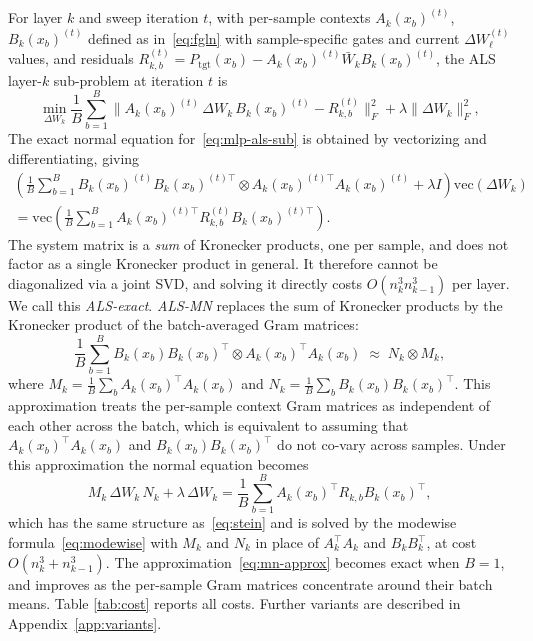 \documentclass{article}
\newcommand{\normF}[1]{\|#1\|_F}
\newcommand{\Ptgt}{P_{\mathrm{tgt}}}
\newcommand{\vecop}{\mathrm{vec}}
\begin{document}
For layer $k$ and sweep iteration $t$, with per-sample contexts $A_k(x_b)^{(t)}$, $B_k(x_b)^{(t)}$ defined as
in~\eqref{eq:fgln} with sample-specific gates and current $\Delta W_\ell^{(t)}$ values, and residuals
$R_{k,b}^{(t)} = \Ptgt(x_b) - A_k(x_b)^{(t)}\bar W_k B_k(x_b)^{(t)}$, the ALS layer-$k$
sub-problem at iteration $t$ is
\begin{equation}
  \min_{\Delta W_k}
  \frac{1}{B}\sum_{b=1}^B
  \normF{A_k(x_b)^{(t)}\,\Delta W_k\,B_k(x_b)^{(t)} - R_{k,b}^{(t)}}^2
  + \lambda \normF{\Delta W_k}^2,
  \label{eq:mlp-als-sub}
\end{equation}
The exact normal equation for~\eqref{eq:mlp-als-sub} is obtained by
vectorizing and differentiating, giving
\begin{align}
  \left(
    \frac{1}{B}\sum_{b=1}^B B_k(x_b)^{(t)}B_k(x_b)^{(t)\top} \otimes A_k(x_b)^{(t)\top} A_k(x_b)^{(t)}
    + \lambda I
  \right) \vecop(\Delta W_k) \nonumber
  \\= \vecop\!\left(\frac{1}{B}\sum_{b=1}^B A_k(x_b)^{(t)\top} R_{k,b}^{(t)} B_k(x_b)^{(t)\top}\right).
  \label{eq:mlp-exact-normal}
\end{align}
The system matrix is a \emph{sum} of Kronecker products, one per sample,
and does not factor as a single Kronecker product in general.
It therefore cannot be diagonalized via a joint SVD, and solving it directly
costs $O(n_k^3 n_{k-1}^3)$ per layer. We call this \emph{ALS-exact}.
%
\emph{ALS-MN} replaces the sum of Kronecker products by the Kronecker product
of the batch-averaged Gram matrices:
\begin{equation}
  \frac{1}{B}\sum_{b=1}^B B_k(x_b)B_k(x_b)^\top \otimes A_k(x_b)^\top A_k(x_b)
  \;\approx\;
  N_k \otimes M_k,
  \label{eq:mn-approx}
\end{equation}
where $M_k = \frac{1}{B}\sum_b A_k(x_b)^\top A_k(x_b)$ and
$N_k = \frac{1}{B}\sum_b B_k(x_b)B_k(x_b)^\top$.
This approximation treats the per-sample context Gram matrices as independent
of each other across the batch, which is equivalent to assuming that
$A_k(x_b)^\top A_k(x_b)$ and $B_k(x_b)B_k(x_b)^\top$ do not co-vary across
samples.
Under this approximation the normal equation becomes
\begin{equation}
  M_k\, \Delta W_k\, N_k + \lambda\, \Delta W_k
  = \frac{1}{B}\sum_{b=1}^B A_k(x_b)^\top R_{k,b} B_k(x_b)^\top,
  \label{eq:mlp-mn-normal}
\end{equation}
which has the same  structure as~\eqref{eq:stein} and is solved by the
modewise formula~\eqref{eq:modewise} with $M_k$ and $N_k$ in place of
$A_k^\top A_k$ and $B_k B_k^\top$, at cost $O(n_k^3 + n_{k-1}^3)$.
The approximation~\eqref{eq:mn-approx} becomes exact when $B = 1$, and
improves as the per-sample Gram matrices concentrate around their batch means.
Table \ref{tab:cost} reports all costs. Further variants are described in Appendix~\ref{app:variants}.
\end{document}
